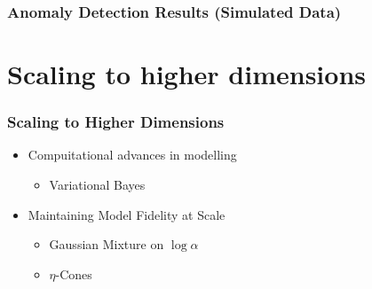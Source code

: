 \documentclass[aspectratio=169]{beamer}
\begin{document}
\begin{frame}
  \frametitle{Anomaly Detection Results (Simulated Data)}
  \begin{center}
    
  \end{center}
\end{frame}

\section{Scaling to higher dimensions}

\begin{frame}
  \frametitle{Scaling to Higher Dimensions}
  \begin{itemize}
    \item Compuitational advances in modelling
      \begin{itemize}
        \item Variational Bayes
      \end{itemize}
    \item Maintaining Model Fidelity at Scale
      \begin{itemize}
        \item Gaussian Mixture on $\log\alpha$
        \item $\eta$-Cones
      \end{itemize}
  \end{itemize}
\end{frame}
\end{document}
